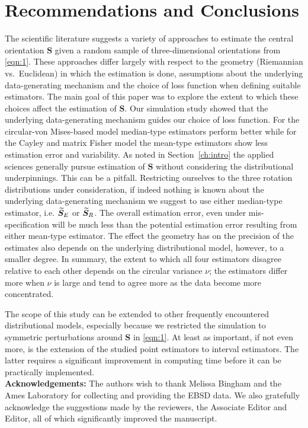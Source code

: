\section{Recommendations and Conclusions}\label{sec:disc}

The scientific literature suggests a variety of approaches to estimate the central orientation $\bm S$ given a random sample of three-dimensional orientations from \eqref{eqn:1}. These approaches differ largely with respect to the geometry (Riemannian vs.~Euclidean) in which the estimation is done, assumptions about the underlying data-generating mechanism and the choice of loss function when defining suitable estimators. The main goal of this paper was to explore the extent to which these choices affect the estimation of $\bm S$. 
Our simulation study showed that  the underlying data-generating mechanism guides our choice of loss function.  For the circular-von Mises-based model median-type estimators perform better while for the Cayley and matrix Fisher model the mean-type estimators show less estimation error and variability. As noted in Section~\ref{ch:intro} the applied sciences generally pursue estimation of $\bm S$ without considering the distributional underpinnings. This can be a pitfall. Restricting ourselves to the three rotation distributions under consideration,  if indeed nothing is known about the underlying data-generating mechanism we suggest to use either median-type estimator, i.e. ${\widetilde{\bm S}_E}$ or ${\widetilde{\bm S}_R}$. The overall estimation error, even under mis-specification will be much less than the potential estimation error resulting from either mean-type estimator. The effect the geometry has on the precision of the estimates also depends on the underlying distributional model, however, to a smaller degree. %
In summary, the extent to which all four estimators disagree relative to each other depends on the circular variance $\nu$; the estimators differ more when $\nu$ is large and tend to agree more as the data become more concentrated.  
   
The scope of this study can be extended to other frequently encountered distributional models, especially because we restricted the simulation to symmetric perturbations around $\bm S$ in \eqref{eqn:1}. At least as important, if not even more, is the extension of the studied point estimators to interval estimators. The latter requires a significant improvement in computing time before it can be practically implemented. \\

\noindent \textbf{Acknowledgements:} The authors wish to thank Melissa Bingham and the Ames Laboratory for collecting and providing the EBSD data. We also gratefully acknowledge the suggestions made by the reviewers, the Associate Editor and Editor, all of which significantly improved the manuscript.

